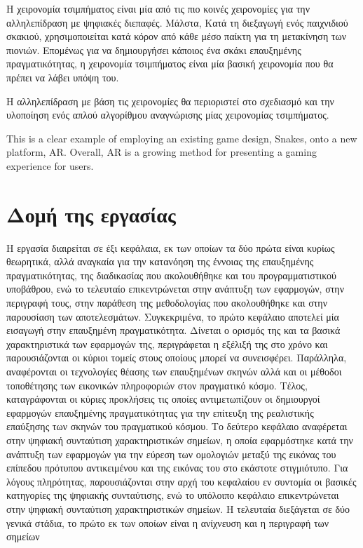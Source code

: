 Η χειρονομία τσιμπήματος είναι μία από τις πιο κοινές χειρονομίες για την αλληλεπίδραση με ψηφιακές διεπαφές. 
Μάλστα, Κατά τη διεξαγωγή ενός παιχνιδιού σκακιού, χρησιμοποιείται κατά κόρον από κάθε μέσο παίκτη για τη μετακίνηση των πιονιών. Επομένως για να δημιουργήσει κάποιος ένα σκάκι επαυξημένης πραγματικότητας, η χειρονομία τσιμπήματος είναι μία βασική χειρονομία που θα πρέπει να λάβει υπόψη του. 

Η αλληλεπίδραση με βάση τις χειρονομίες θα περιοριστεί στο σχεδιασμό και την υλοποίηση ενός απλού αλγορίθμου αναγνώρισης μίας χειρονομίας τσιμπήματος.

This is a clear example of employing an existing game design,
Snakes, onto a new platform, AR.
Overall, AR
is a growing method for presenting a gaming experience for users.



\section{Δομή της εργασίας}

Η εργασία διαιρείται σε έξι κεφάλαια, εκ των οποίων τα δύο πρώτα είναι κυρίως θεωρητικά, αλλά αναγκαία για την κατανόηση της έννοιας της επαυξημένης πραγματικότητας, της διαδικασίας που ακολουθήθηκε και του προγραμματιστικού υποβάθρου, ενώ το τελευταίο επικεντρώνεται στην ανάπτυξη των εφαρμογών, στην περιγραφή τους, στην παράθεση της μεθοδολογίας που ακολουθήθηκε και στην παρουσίαση των αποτελεσμάτων.
Συγκεκριμένα, το πρώτο κεφάλαιο αποτελεί μία εισαγωγή στην επαυξημένη πραγματικότητα.
Δίνεται ο ορισμός της και τα βασικά χαρακτηριστικά των εφαρμογών της, περιγράφεται η εξέλιξή της στο χρόνο και παρουσιάζονται οι κύριοι τομείς στους οποίους μπορεί να συνεισφέρει. Παράλληλα, αναφέρονται οι τεχνολογίες θέασης των επαυξημένων σκηνών αλλά και οι μέθοδοι τοποθέτησης των εικονικών πληροφοριών στον πραγματικό κόσμο. Τέλος, καταγράφονται οι κύριες προκλήσεις τις οποίες αντιμετωπίζουν οι δημιουργοί εφαρμογών επαυξημένης πραγματικότητας για την επίτευξη της ρεαλιστικής επαύξησης των σκηνών του πραγματικού κόσμου.
Το δεύτερο κεφάλαιο αναφέρεται στην ψηφιακή συνταύτιση χαρακτηριστικών σημείων, η οποία εφαρμόστηκε κατά την ανάπτυξη των εφαρμογών για την εύρεση των ομολογιών μεταξύ της εικόνας του επίπεδου πρότυπου αντικειμένου και της εικόνας του στο εκάστοτε στιγμιότυπο. Για λόγους πληρότητας, παρουσιάζονται στην αρχή του κεφαλαίου εν συντομία οι βασικές κατηγορίες της ψηφιακής συνταύτισης, ενώ το υπόλοιπο κεφάλαιο επικεντρώνεται στην ψηφιακή συνταύτιση χαρακτηριστικών σημείων. Η τελευταία διεξάγεται σε δύο γενικά στάδια, το πρώτο εκ των οποίων είναι η ανίχνευση και η περιγραφή των σημείων

